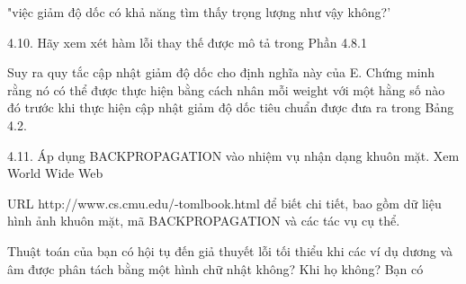 "việc giảm độ dốc có khả năng tìm thấy trọng lượng như vậy không?'

4.10. Hãy xem xét hàm lỗi thay thế được mô tả trong Phần 4.8.1

Suy ra quy tắc cập nhật giảm độ dốc cho định nghĩa này của E. Chứng minh rằng nó có thể được thực hiện bằng cách nhân mỗi weight với một hằng số nào đó trước khi thực hiện cập nhật giảm độ dốc tiêu chuẩn được đưa ra trong Bảng 4.2.

4.11. Áp dụng BACKPROPAGATION vào nhiệm vụ nhận dạng khuôn mặt. Xem World Wide Web

URL http://www.cs.cmu.edu/-tomlbook.html để biết chi tiết, bao gồm dữ liệu hình ảnh khuôn mặt, mã BACKPROPAGATION và các tác vụ cụ thể.

Thuật toán của bạn có hội tụ đến giả thuyết lỗi tối thiểu khi các ví dụ dương và âm được phân tách bằng một hình chữ nhật không? Khi họ không? Bạn có

